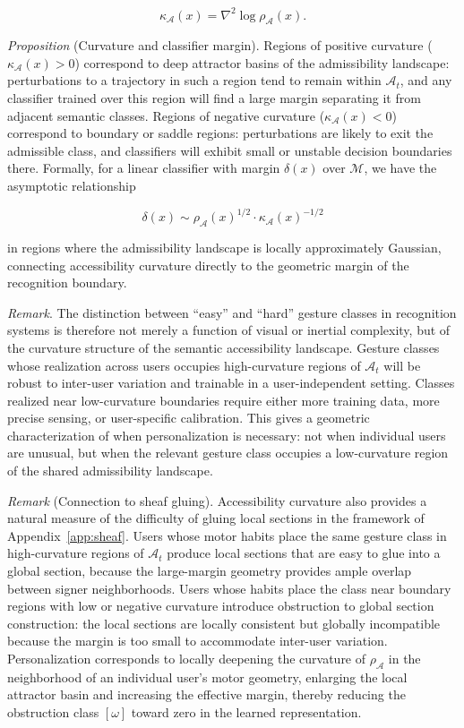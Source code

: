 \documentclass[11pt, a4paper]{article}
\theoremstyle{definition}
\begin{document}
\[
\kappa_\mathcal{A}(x) = \nabla^2 \log \rho_\mathcal{A}(x).
\]

\textit{Proposition} (Curvature and classifier margin). Regions of positive curvature ($\kappa_\mathcal{A}(x) > 0$) correspond to deep attractor basins of the admissibility landscape: perturbations to a trajectory in such a region tend to remain within $\mathcal{A}_t$, and any classifier trained over this region will find a large margin separating it from adjacent semantic classes. Regions of negative curvature ($\kappa_\mathcal{A}(x) < 0$) correspond to boundary or saddle regions: perturbations are likely to exit the admissible class, and classifiers will exhibit small or unstable decision boundaries there. Formally, for a linear classifier with margin $\delta(x)$ over $\mathcal{M}$, we have the asymptotic relationship

\[
\delta(x) \sim \rho_\mathcal{A}(x)^{1/2} \cdot \kappa_\mathcal{A}(x)^{-1/2}
\]

in regions where the admissibility landscape is locally approximately Gaussian, connecting accessibility curvature directly to the geometric margin of the recognition boundary.

\textit{Remark}. The distinction between ``easy'' and ``hard'' gesture classes in recognition systems is therefore not merely a function of visual or inertial complexity, but of the curvature structure of the semantic accessibility landscape. Gesture classes whose realization across users occupies high-curvature regions of $\mathcal{A}_t$ will be robust to inter-user variation and trainable in a user-independent setting. Classes realized near low-curvature boundaries require either more training data, more precise sensing, or user-specific calibration. This gives a geometric characterization of when personalization is necessary: not when individual users are unusual, but when the relevant gesture class occupies a low-curvature region of the shared admissibility landscape.

\textit{Remark} (Connection to sheaf gluing). Accessibility curvature also provides a natural measure of the difficulty of gluing local sections in the framework of Appendix~\ref{app:sheaf}. Users whose motor habits place the same gesture class in high-curvature regions of $\mathcal{A}_t$ produce local sections that are easy to glue into a global section, because the large-margin geometry provides ample overlap between signer neighborhoods. Users whose habits place the class near boundary regions with low or negative curvature introduce obstruction to global section construction: the local sections are locally consistent but globally incompatible because the margin is too small to accommodate inter-user variation. Personalization corresponds to locally deepening the curvature of $\rho_\mathcal{A}$ in the neighborhood of an individual user's motor geometry, enlarging the local attractor basin and increasing the effective margin, thereby reducing the obstruction class $[\omega]$ toward zero in the learned representation.
\end{document}
